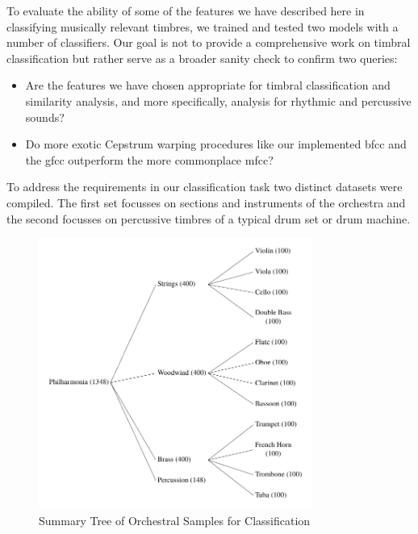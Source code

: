 {{{{To evaluate the ability of some of the features we have described here in classifying musically relevant timbres, we trained and tested two models with a number of classifiers. Our goal is not to provide a comprehensive work on timbral classification but rather serve as a broader sanity check to confirm two queries:

\begin{itemize}
  \item Are the features we have chosen appropriate for timbral classification and similarity analysis, and more specifically, analysis for rhythmic and percussive sounds?
  \item Do more exotic Cepstrum warping procedures like our implemented \acrshort{bfcc} and the \acrshort{gfcc} outperform the more commonplace \acrshort{mfcc}?
\end{itemize}

To address the requirements in our classification task two distinct datasets were compiled. The first set focusses on sections and instruments of the orchestra and the second focusses on percussive timbres of a typical drum set or drum machine.

\begin{figure}
	\begin{center}
		\includegraphics[width=0.8\textwidth]{ch05_pyconcat/figures/orch_distribution.pdf}
	\end{center}
	\caption[Summary Tree of Orchestral Samples for Classification]{Summary Tree of Orchestral Samples for Classification}
	\label{fig:orch_distribution}
\end{figure}

}}}}
